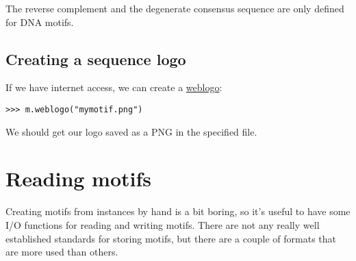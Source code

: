 The reverse complement and the degenerate consensus sequence are
only defined for DNA motifs.

\subsection{Creating a sequence logo}
If we have internet access, we can create a \href{https://weblogo.berkeley.edu}{weblogo}:
\begin{verbatim}
>>> m.weblogo("mymotif.png")
\end{verbatim}
We should get our logo saved as a PNG in the specified file.

\section{Reading motifs}
\label{sec:io}

Creating motifs from instances by hand is a bit boring, so it's
useful to have some I/O functions for reading and writing
motifs. There are not any really well established standards for storing
motifs, but there are a couple of formats that are more used than
others.

